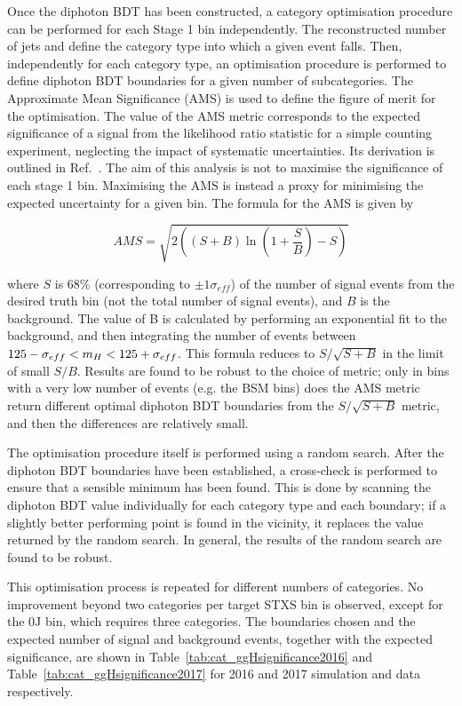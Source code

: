 Once the diphoton BDT has been constructed, 
a category optimisation procedure can be performed for each Stage 1 bin independently.
The reconstructed number of jets and \ptgg define the category type into which a given event falls.
Then, independently for each category type, 
an optimisation procedure is performed to define diphoton BDT boundaries 
for a given number of subcategories.
The Approximate Mean Significance (AMS) is used to define the figure of merit for the optimisation.
The value of the AMS metric corresponds to the expected significance of a signal 
from the likelihood ratio statistic for a simple counting experiment, 
neglecting the impact of systematic uncertainties.
Its derivation is outlined in Ref.~\cite{Asymptotic}.
The aim of this analysis is not to maximise the significance of each stage 1 bin.
Maximising the AMS is instead a proxy for minimising the expected uncertainty for a given bin.
The formula for the AMS is given by 

\begin{equation*}
  AMS = \sqrt{ 2 \left( (S+B) \ln{\left(1+\frac{S}{B}\right)} - S \right) }
\end{equation*}

where $S$ is 68\% (corresponding to $\pm 1\sigma_{eff}$) of the number of signal events 
from the desired truth bin (not the total number of signal events), and $B$ is the background.
The value of B is calculated by performing an exponential fit to the background, 
and then integrating the number of events between $125 - \sigma_{eff} < m_{H} < 125 + \sigma_{eff}$.
This formula reduces to $S/\sqrt{S+B}$ in the limit of small $S/B$.
Results are found to be robust to the choice of metric; 
only in bins with a very low number of events (e.g. the BSM bins) 
does the AMS metric return different optimal diphoton BDT boundaries from the $S/\sqrt{S+B}$ metric, 
and then the differences are relatively small.

The optimisation procedure itself is performed using a random search. 
After the diphoton BDT boundaries have been established, 
a cross-check is performed to ensure that a sensible minimum has been found.
This is done by scanning the diphoton BDT value individually for each category type and each boundary; 
if a slightly better performing point is found in the vicinity, 
it replaces the value returned by the random search.
In general, the results of the random search are found to be robust.

This optimisation process is repeated for different numbers of categories.
No improvement beyond two categories per target STXS bin is observed, 
except for the 0J bin, which requires three categories.
The boundaries chosen and the expected number of signal and background events, 
together with the expected significance, 
are shown in Table~\ref{tab:cat_ggHsignificance2016} and Table~\ref{tab:cat_ggHsignificance2017} 
for 2016 and 2017 simulation and data respectively.

